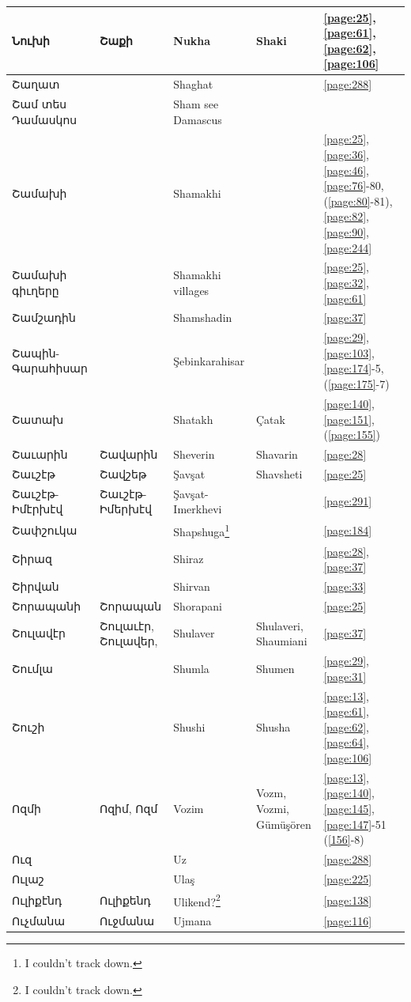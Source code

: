 \begin{center}
\begin{longtable}{|p{}|p{3cm}|p{3cm}|p{2cm}|p{3cm}|}
Նուխի&   Շաքի& Nukha  & Shaki&\ref{page:25}, \ref{page:61}, \ref{page:62}, \ref{page:106}\\ \hline
Շաղատ& &Shaghat & &\ref{page:288}\\ \hline
Շամ տես Դամասկոս& &Sham see Damascus & &\\ \hline
Շամախի& &Shamakhi & &\ref{page:25}, \ref{page:36}, \ref{page:46}, \ref{page:76}-80, (\ref{page:80}-81), \ref{page:82}, \ref{page:90}, \ref{page:244}\\ \hline
Շամախի գիւղերը& &Shamakhi villages & &\ref{page:25}, \ref{page:32}, \ref{page:61}\\ \hline
Շամշադին& &Shamshadin & &\ref{page:37}\\ \hline
Շապին-Գարահիսար& & Şebinkarahisar& &\ref{page:29}, \ref{page:103}, \ref{page:174}-5, (\ref{page:175}-7)\\ \hline
Շատախ& &   Shatakh& Çatak&\ref{page:140}, \ref{page:151}, (\ref{page:155})\\ \hline
Շաւարին& Շավարին&  Sheverin &Shavarin &\ref{page:28}\\ \hline
Շաւշէթ&Շավշեթ &Şavşat &Shavsheti &\ref{page:25}\\ \hline
Շաւշէթ-Իմէրխէվ&Շաւշէթ-Իմերխէվ & Şavşat-Imerkhevi& &\ref{page:291}\\ \hline
Շափշուկա& & Shapshuga\footnote{I couldn't track down.}& &\ref{page:184}\\ \hline
Շիրազ& &Shiraz & &\ref{page:28}, \ref{page:37}\\ \hline
Շիրվան& &Shirvan & &\ref{page:33}\\ \hline
Շորապանի&Շորապան & Shorapani& &\ref{page:25}\\ \hline
Շուլավէր&Շուլաւէր, Շուլավեր,  & Shulaver &Shulaveri, Shaumiani &   \ref{page:37}\\ \hline
Շումլա& &Shumla & Shumen& \ref{page:29}, \ref{page:31} \\ \hline
Շուշի& & Shushi&Shusha &\ref{page:13}, \ref{page:61}, \ref{page:62}, \ref{page:64}, \ref{page:106} \\\hline
Ոզմի& Ոզիմ, Ոզմ& Vozim&Vozm, Vozmi, Gümüşören & \ref{page:13}, \ref{page:140}, \ref{page:145}, \ref{page:147}-51 (\ref{156}-8) \\ \hline 
Ուզ & &Uz & &    \ref{page:288}\\ \hline
Ուլաշ& &Ulaş & &\ref{page:225}\\ \hline
Ուլիքէնդ&Ուլիքենդ & Ulikend?\footnote{I couldn't track down.}& &\ref{page:138}\\ \hline
Ուչմանա& Ուջմանա&Ujmana & &\ref{page:116}\\ \hline

\end{longtable}
\end{center}
